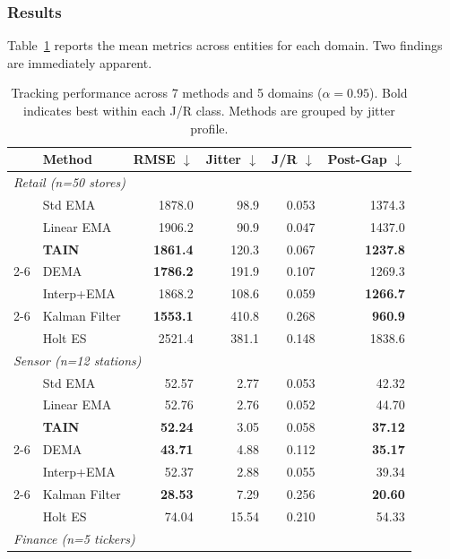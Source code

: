 \documentclass[11pt,a4paper]{article}
\begin{document}
\subsubsection{Results}

Table~\ref{tab:main_results} reports the mean metrics across entities for each
domain. Two findings are immediately apparent.

\begin{table}[h]
\centering
\caption{Tracking performance across 7 methods and 5 domains ($\alpha = 0.95$).
Bold indicates best within each J/R class. Methods are grouped by jitter profile.}
\label{tab:main_results}
\small
\begin{tabular}{ll rrrr}
\toprule
& Method & RMSE $\downarrow$ & Jitter $\downarrow$ & J/R $\downarrow$ & Post-Gap $\downarrow$ \\
\midrule
\multicolumn{6}{l}{\textit{Retail (n=50 stores)}} \\
& Std EMA           & 1878.0 &  98.9 & 0.053 & 1374.3 \\
& Linear EMA        & 1906.2 &  90.9 & 0.047 & 1437.0 \\
& \textbf{TAIN}     & \textbf{1861.4} & 120.3 & 0.067 & \textbf{1237.8} \\
\cmidrule{2-6}
& DEMA              & \textbf{1786.2} & 191.9 & 0.107 & 1269.3 \\
& Interp+EMA        & 1868.2 & 108.6 & 0.059 & \textbf{1266.7} \\
\cmidrule{2-6}
& Kalman Filter     & \textbf{1553.1} & 410.8 & 0.268 & \textbf{960.9} \\
& Holt ES           & 2521.4 & 381.1 & 0.148 & 1838.6 \\
\midrule
\multicolumn{6}{l}{\textit{Sensor (n=12 stations)}} \\
& Std EMA           &  52.57 &  2.77 & 0.053 & 42.32 \\
& Linear EMA        &  52.76 &  2.76 & 0.052 & 44.70 \\
& \textbf{TAIN}     &  \textbf{52.24} &  3.05 & 0.058 & \textbf{37.12} \\
\cmidrule{2-6}
& DEMA              &  \textbf{43.71} &  4.88 & 0.112 & \textbf{35.17} \\
& Interp+EMA        &  52.37 &  2.88 & 0.055 & 39.34 \\
\cmidrule{2-6}
& Kalman Filter     &  \textbf{28.53} &  7.29 & 0.256 & \textbf{20.60} \\
& Holt ES           &  74.04 & 15.54 & 0.210 & 54.33 \\
\midrule
\multicolumn{6}{l}{\textit{Finance (n=5 tickers)}} \\

\end{tabular}
\end{table}
\end{document}
